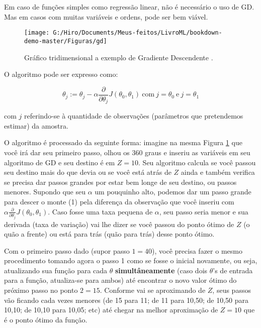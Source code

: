 \documentclass[
  openany]{book}
\begin{document}
Em caso de funções simples como regressão linear, não é necessário o uso de GD. Mas em casos com muitas variáveis e ordens, pode ser bem viável.

\begin{figure}

{\centering \texttt{[image: G:/Hiro/Documents/Meus-feitos/LivroML/bookdown-demo-master/Figuras/gd]} 

}

\caption{Gráfico tridimensional a exemplo de Gradiente Descendente \citep{andrewcoursera}.}\label{fig:gd}
\end{figure}



O algoritmo pode ser expresso como:

\begin{equation}
    \theta_j := \theta_j - \alpha \frac{\partial}{\partial \theta_j}J(\theta_0,\theta_1) \ \mbox{com} \ j=\theta_0 \ \mbox{e} \ j=\theta_1     \label{eq:GD}
\end{equation}

com \(j\) referindo-se à quantidade de observações (parâmetros que pretendemos estimar) da amostra.

O algoritmo é processado da seguinte forma: imagine na mesma Figura \ref{fig:gd} que você irá dar seu primeiro passo, olhou os 360 graus e inseriu as variáveis em seu algoritmo de GD e seu destino é em \(Z=10\). Seu algoritmo calcula se você passou seu destino mais do que devia ou se você está atrás de \(Z\) ainda e também verifica se precisa dar passos grandes por estar bem longe de seu destino, ou passos menores. Supondo que seu \(\alpha\) um pouquinho alto, podemos dar um passo grande para descer o monte (1) pela diferença da observação que você inseriu com \(\alpha \frac{\partial}{\partial \theta_j}J(\theta_0,\theta_1)\). Caso fosse uma taxa pequena de \(\alpha\), seu passo seria menor e sua derivada (taxa de variação) vai lhe dizer se você passou do ponto ótimo de \(Z\) (o quão a frente) ou está para trás (quão para trás) desse ponto ótimo.

Com o primeiro passo dado (supor passo \(1 = 40\)), você precisa fazer o mesmo procedimento tomando agora o passo 1 como se fosse o inicial novamente, ou seja, atualizando sua função para cada \(\theta\) \textbf{simultâneamente} (caso dois \(\theta\)'s de entrada para a função, atualiza-se para ambos) até encontrar o novo valor ótimo do próximo passo no ponto \(2=15\). Conforme vai se aproximando de \(Z\), seus passos vão ficando cada vezes menores (de 15 para 11; de 11 para 10,50; de 10,50 para 10,10; de 10,10 para 10,05; etc) até chegar na melhor aproximação de \(Z=10\) que é o ponto ótimo da função.
\end{document}
